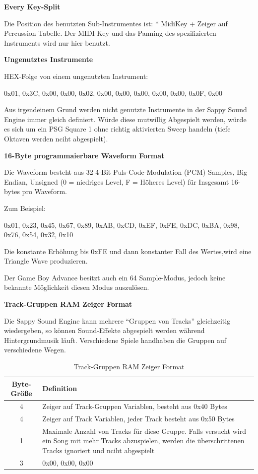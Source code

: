 \documentclass[11pt,a4paper]{scrartcl}
\newcommand{\paratitle}[1] {
    \vspace{5mm}
    \large \textbf{#1} \normalsize
    \vspace{2mm}\newline
}
\begin{document}
\paratitle{Every Key-Split}
Die Position des benutzten Sub-Instrumentes ist: * MidiKey + Zeiger auf Percussion Tabelle.\newline
Der MIDI-Key und das Panning des spezifizierten Instruments wird nur hier benutzt.


\paratitle{Ungenutztes Instrumente}
HEX-Folge von einem ungenutzten Instrument:

0x01, 0x3C, 0x00, 0x00, 0x02, 0x00, 0x00, 0x00, 0x00, 0x00, 0x0F, 0x00

Aus irgendeinem Grund werden nicht genutzte Instrumente in der Sappy Sound Engine immer gleich definiert. W\"urde diese mutwillig Abgespielt werden, w\"urde es sich um ein PSG Square 1 ohne richtig aktivierten Sweep handeln (tiefe Oktaven werden nciht abgespielt).
		
\paratitle{\large 16-Byte programmaierbare Waveform Format}
Die Waveform besteht aus 32 4-Bit Puls-Code-Modulation (PCM) Samples, Big Endian, Unsigned (0 = niedriges Level, F = H\"oheres Level) f\"ur Insgesamt 16-bytes pro Waveform.

Zum Beispiel:

0x01, 0x23, 0x45, 0x67, 0x89, 0xAB, 0xCD, 0xEF, 0xFE, 0xDC, 0xBA, 0x98, 0x76, 0x54, 0x32, 0x10

Die konstante Erh\"ohung bis 0xFE und dann konstanter Fall des Wertes,wird eine Triangle Wave produzieren.

Der Game Boy Advance besitzt auch ein 64 Sample-Modus, jedoch keine bekannte M\"oglichkeit diesen Modus auszul\"osen.

\newpage
\paratitle{Track-Gruppen RAM Zeiger Format}
Die Sappy Sound Engine kann mehrere \enquote{Gruppen von Tracks} gleichzeitig wiedergeben, so k\"onnen Sound-Effekte abgespielt werden w\"ahrend Hintergrundmusik l\"auft. Verschiedene Spiele handhaben die Gruppen auf verschiedene Wegen.

\begin{table}[h]
    \centering
    \begin{tabular}{ c | p{15cm} }
        \textbf{Byte-Gr\"o{\ss}e} & \textbf{Definition}\\
        \hline
        4 & Zeiger auf Track-Gruppen Variablen, besteht aus 0x40 Bytes\\
				\hline
        4 & Zeiger auf Track Variablen, jeder Track besteht aus 0x50 Bytes\\
				\hline
        1 & Maximale Anzahl von Tracks f\"ur diese Gruppe. Falls versucht wird ein Song mit mehr Tracks abzuspielen, werden die \"uberschrittenen Tracks ignoriert und nciht abgespielt\\
				\hline
        3 & 0x00, 0x00, 0x00\\
    \end{tabular}
    \caption{Track-Gruppen RAM Zeiger Format}
    \label{table:RAMZeiger}
\end{table}
\end{document}
